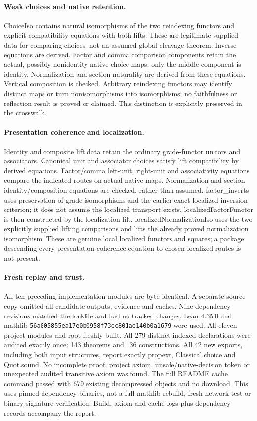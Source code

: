 \documentclass{article}
\begin{document}
\paragraph{Weak choices and native retention.} ChoiceIso contains natural isomorphisms of the two reindexing functors and explicit compatibility equations with both lifts. These are legitimate supplied data for comparing choices, not an assumed global-cleavage theorem. Inverse equations are derived. Factor and comma comparison components retain the actual, possibly nonidentity native choice maps; only the middle component is identity. Normalization and section naturality are derived from these equations. Vertical composition is checked. Arbitrary reindexing functors may identify distinct maps or turn nonisomorphisms into isomorphisms; no faithfulness or reflection result is proved or claimed. This distinction is explicitly preserved in the crosswalk.
\paragraph{Presentation coherence and localization.} Identity and composite lift data retain the ordinary grade-functor unitors and associators. Canonical unit and associator choices satisfy lift compatibility by derived equations. Factor/comma left-unit, right-unit and associativity equations compare the indicated routes on actual native maps. Normalization and section identity/composition equations are checked, rather than assumed. factor\_inverts uses preservation of grade isomorphisms and the earlier exact localized inversion criterion; it does not assume the localized transport exists. localizedFactorFunctor is then constructed by the localization lift. localizedNormalizationIso uses the two explicitly supplied lifting comparisons and lifts the already proved normalization isomorphism. These are genuine local localized functors and squares; a package descending every presentation coherence equation to chosen localized routes is not present.
\paragraph{Fresh replay and trust.} All ten preceding implementation modules are byte-identical. A separate source copy omitted all candidate outputs, evidence and caches. Nine dependency revisions matched the lockfile and had no tracked changes. Lean 4.35.0 and mathlib \texttt{56a005855ea17e0b0958f73ec801ae140b0a1679} were used. All eleven project modules and root freshly built. All 279 distinct indexed declarations were audited exactly once: 143 theorems and 136 constructions. All 42 new exports, including both input structures, report exactly propext, Classical.choice and Quot.sound. No incomplete proof, project axiom, unsafe/native-decision token or unexpected audited transitive axiom was found. The full README cache command passed with 679 existing decompressed objects and no download. This uses pinned dependency binaries, not a full mathlib rebuild, fresh-network test or binary-signature verification. Build, axiom and cache logs plus dependency records accompany the report.
\end{document}

